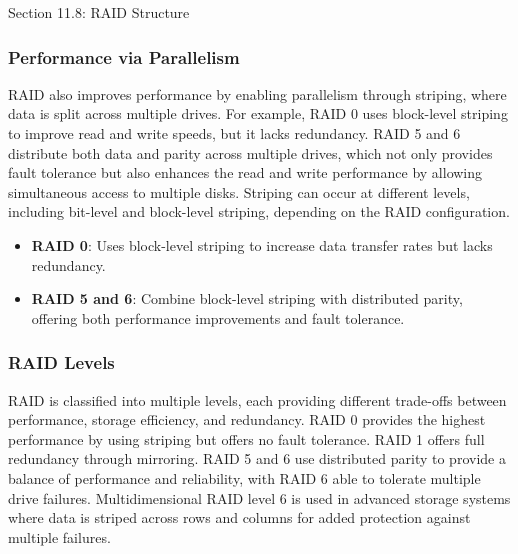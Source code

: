 \begin{notes}{Section 11.8: RAID Structure}
\begin{highlight}
    \end{highlight}
    
    \subsubsection*{Performance via Parallelism}
    
    RAID also improves performance by enabling parallelism through striping, where data is split across multiple drives. For example, RAID 0 uses block-level striping to improve read and write speeds, 
    but it lacks redundancy. RAID 5 and 6 distribute both data and parity across multiple drives, which not only provides fault tolerance but also enhances the read and write performance by allowing 
    simultaneous access to multiple disks. Striping can occur at different levels, including bit-level and block-level striping, depending on the RAID configuration.
    
    \begin{highlight}
    
        \begin{itemize}
            \item \textbf{RAID 0}: Uses block-level striping to increase data transfer rates but lacks redundancy.
            \item \textbf{RAID 5 and 6}: Combine block-level striping with distributed parity, offering both performance improvements and fault tolerance.
        \end{itemize}
    
    \end{highlight}
    
    \subsubsection*{RAID Levels}
    
    RAID is classified into multiple levels, each providing different trade-offs between performance, storage efficiency, and redundancy. RAID 0 provides the highest performance by using striping but offers 
    no fault tolerance. RAID 1 offers full redundancy through mirroring. RAID 5 and 6 use distributed parity to provide a balance of performance and reliability, with RAID 6 able to tolerate multiple drive 
    failures. Multidimensional RAID level 6 is used in advanced storage systems where data is striped across rows and columns for added protection against multiple failures.


\end{notes}

